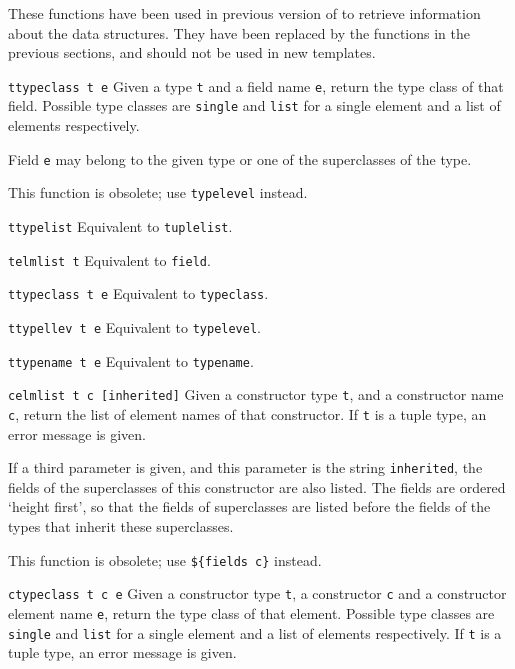 These functions have been used in previous version of {\Tm} to retrieve
information about the data structures.
They have been replaced by the functions in the previous sections,
and should not be used in new templates.
\begin{desctab}
\item[\texttt{ttypeclass t e}]
Given a type \texttt{t} and a field name \texttt{e}, return the type class
of that field.  Possible type classes are \texttt{single} and \texttt{list}
for a single element and a list of elements respectively.

Field \texttt{e} may belong to the given type or one of the superclasses
of the type.

This function is obsolete; use \verb'typelevel' instead.

\item[\texttt{ttypelist}]
Equivalent to \texttt{tuplelist}.

\item[\texttt{telmlist t}]
Equivalent to \texttt{field}.

\item[\texttt{ttypeclass t e}]
Equivalent to \texttt{typeclass}.

\item[\texttt{ttypellev t e}]
Equivalent to \texttt{typelevel}.

\item[\texttt{ttypename t e}]
Equivalent to \texttt{typename}.

\item[\texttt{celmlist t c [inherited]}]
Given a constructor type \texttt{t}, and a constructor name \texttt{c},
return the list of element names of that constructor.
If \texttt{t} is a tuple type, an error message is given.

If a third parameter is given, and this parameter is the string
\texttt{inherited}, the fields of the superclasses of this constructor are also
listed. The fields are ordered `height first', so that the fields of
superclasses are listed before the fields of the types that inherit these
superclasses.

This function is obsolete; use \verb'${fields c}' instead.

\item[\texttt{ctypeclass t c e}]
Given a constructor type \texttt{t}, a constructor \texttt{c} and a constructor
element name \texttt{e}, return the type class of that element.  Possible
type classes are \texttt{single} and \texttt{list} for a single element and
a list of elements respectively.  If \texttt{t} is a tuple type, an error
message is given.


\end{desctab}

